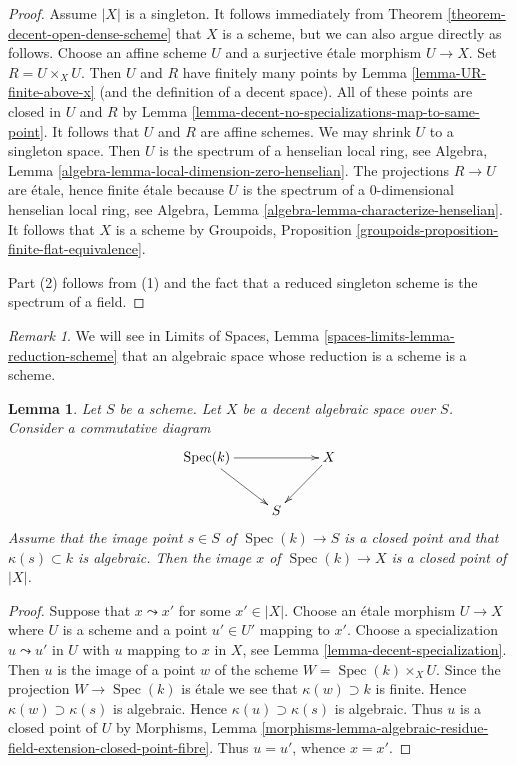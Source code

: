 \documentclass{stacks-project}
\theoremstyle{plain}
\newtheorem{lemma}[subsection]{Lemma}
\theoremstyle{definition}
\theoremstyle{remark}
\newtheorem{remark}[subsection]{Remark}
\numberwithin{equation}{subsection}
\def\Spec{\mathop{\mathrm{Spec}}}
\begin{document}
\begin{proof}
Assume $|X|$ is a singleton. It follows immediately from
Theorem \ref{theorem-decent-open-dense-scheme} that $X$ is a scheme,
but we can also argue directly as follows.
Choose an affine scheme $U$ and a surjective \'etale morphism $U \to X$.
Set $R = U \times_X U$. Then $U$ and $R$ have finitely many points by
Lemma \ref{lemma-UR-finite-above-x} (and the definition of a decent space).
All of these points are closed in $U$ and $R$ by
Lemma \ref{lemma-decent-no-specializations-map-to-same-point}.
It follows that $U$ and $R$ are affine schemes.
We may shrink $U$ to a singleton space. Then $U$ is
the spectrum of a henselian local ring, see
Algebra, Lemma \ref{algebra-lemma-local-dimension-zero-henselian}.
The projections $R \to U$ are \'etale, hence finite \'etale because
$U$ is the spectrum of a $0$-dimensional henselian local ring, see
Algebra, Lemma \ref{algebra-lemma-characterize-henselian}.
It follows that $X$ is a scheme by
Groupoids, Proposition \ref{groupoids-proposition-finite-flat-equivalence}.

\medskip\noindent
Part (2) follows from (1) and the fact that a reduced singleton
scheme is the spectrum of a field.
\end{proof}

\begin{remark}
\label{remark-one-point-decent-scheme}
We will see in
Limits of Spaces, Lemma \ref{spaces-limits-lemma-reduction-scheme}
that an algebraic space
whose reduction is a scheme is a scheme.
\end{remark}

\begin{lemma}
\label{lemma-algebraic-residue-field-extension-closed-point}
Let $S$ be a scheme. Let $X$ be a decent algebraic space over $S$.
Consider a commutative diagram
$$
\xymatrix{
\Spec(k) \ar[rr] \ar[rd] & & X \ar[ld] \\
& S
}
$$
Assume that the image point $s \in S$ of $\Spec(k) \to S$ is
a closed point and that $\kappa(s) \subset k$ is algebraic.
Then the image $x$ of $\Spec(k) \to X$ is a closed point of $|X|$.
\end{lemma}

\begin{proof}
Suppose that $x \leadsto x'$ for some $x' \in |X|$. Choose an
\'etale morphism $U \to X$ where $U$ is a scheme and a point $u' \in U'$
mapping to $x'$. Choose a specialization $u \leadsto u'$ in $U$ with $u$
mapping to $x$ in $X$, see Lemma \ref{lemma-decent-specialization}.
Then $u$ is the image of a point $w$ of the scheme
$W = \Spec(k) \times_X U$. Since the projection $W \to \Spec(k)$ is \'etale
we see that $\kappa(w) \supset k$ is finite. Hence
$\kappa(w) \supset \kappa(s)$ is algebraic. Hence $\kappa(u) \supset \kappa(s)$
is algebraic. Thus $u$ is a closed point of $U$ by
Morphisms, Lemma
\ref{morphisms-lemma-algebraic-residue-field-extension-closed-point-fibre}.
Thus $u = u'$, whence $x = x'$.
\end{proof}
\end{document}
